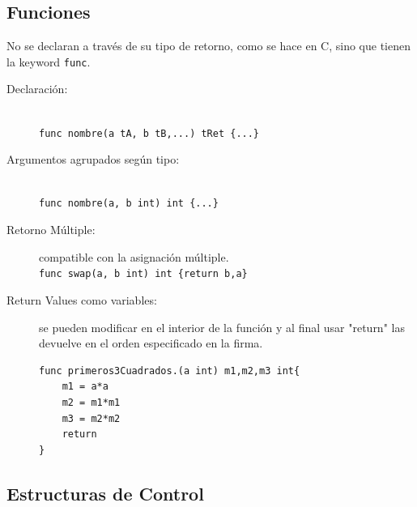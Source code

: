 \documentclass{article}
\begin{document}
\subsection{Funciones}
No se declaran a través de su tipo de retorno, como se hace en C, sino que tienen la keyword \lstinline|func|.
\begin{description}
	\item[Declaración:]\hfill \\
		\lstinline|func nombre(a tA, b tB,...) tRet {...}| 
	\item[Argumentos agrupados según tipo:] \hfill \\
		\lstinline|func nombre(a, b int) int {...}|
	\item[Retorno Múltiple:] compatible con la asignación múltiple. \\
		\lstinline|func swap(a, b int) int {return b,a}|
	\item[Return Values como variables:] se pueden modificar en el interior de la función y al final usar "return" las devuelve en el orden especificado en la firma.
\begin{lstlisting}[caption = una variable elevada al cuadrado 3 veces]
func primeros3Cuadrados.(a int) m1,m2,m3 int{
	m1 = a*a
	m2 = m1*m1
	m3 = m2*m2
	return
}
\end{lstlisting}
\end{description}

\subsection{Estructuras de Control}
\end{document}

